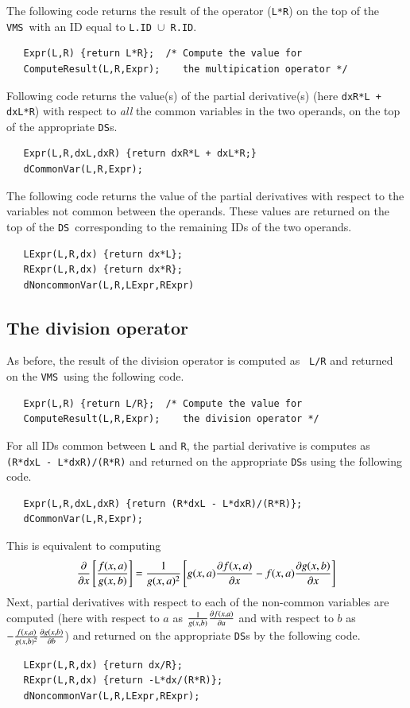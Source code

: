 \documentclass[12pt]{article}
\newcommand{\DS}{{\tt DS}}
\newcommand{\VMS}{{\tt VMS}}
\begin{document}
The following code returns the result of the operator ({\tt L*R}) on
the top of the \VMS\ with an ID equal to {\tt L.ID $\cup$ R.ID}.
\begin{verbatim}
   Expr(L,R) {return L*R};  /* Compute the value for 
   ComputeResult(L,R,Expr);    the multipication operator */
\end{verbatim}
Following code returns the value(s) of the partial derivative(s) (here
{\tt dxR*L + dxL*R}) with respect to {\it all} the common variables in
the two operands, on the top of the appropriate \DS s.  
\begin{verbatim}
   Expr(L,R,dxL,dxR) {return dxR*L + dxL*R;}
   dCommonVar(L,R,Expr);
\end{verbatim}
The following code returns the value of the partial derivatives with
respect to the variables not common between the operands.  These
values are returned on the top of the \DS\ corresponding to the remaining
IDs of the two operands.
\begin{verbatim}
   LExpr(L,R,dx) {return dx*L};
   RExpr(L,R,dx) {return dx*R};
   dNoncommonVar(L,R,LExpr,RExpr)
\end{verbatim}
%
%
\subsection{The division operator}

As before, the result of the division operator is computed as {\tt
L/R} and returned on the \VMS\ using the following code.
\begin{verbatim}
   Expr(L,R) {return L/R};  /* Compute the value for 
   ComputeResult(L,R,Expr);    the division operator */
\end{verbatim}
For all IDs common between {\tt L} and {\tt R}, the partial derivative
is computes as {\tt (R*dxL - L*dxR)/(R*R)} and returned on the
appropriate \DS s using the following code.  
\begin{verbatim}
   Expr(L,R,dxL,dxR) {return (R*dxL - L*dxR)/(R*R)};
   dCommonVar(L,R,Expr);
\end{verbatim}
This is equivalent to computing
\begin{equation}
{\partial \over {\partial x}}\left[{f(x,a) \over g(x,b)}\right] =
{1 \over g(x,a)^2}\left[{g(x,a) {{\partial f(x,a)} \over  {\partial
x}}} - f(x,a) {{\partial g(x,b)} \over {\partial x}}\right] 
\end{equation}
Next, partial derivatives with respect to each of the non-common
variables are computed (here with respect to $a$ as ${1 \over g(x,b)}
{\partial f(x,a) \over \partial a}$ and with respect to $b$ as
$-{f(x,a) \over {g(x,b)^2}}{\partial g(x,b) \over \partial b}$) and
returned on the appropriate \DS s by the following code.
\begin{verbatim}
   LExpr(L,R,dx) {return dx/R};
   RExpr(L,R,dx) {return -L*dx/(R*R)};
   dNoncommonVar(L,R,LExpr,RExpr);
\end{verbatim}
%
%
\end{document}
